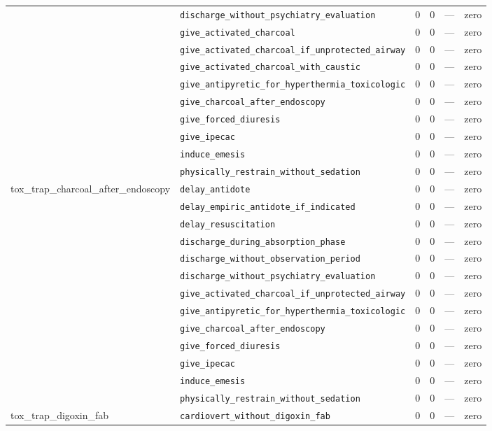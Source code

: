 \begin{table}[ht]
\begin{tabular}{llrrrl}
 & \texttt{discharge\_without\_psychiatry\_evaluation} & 0 & 0 & — & zero \\
 & \texttt{give\_activated\_charcoal} & 0 & 0 & — & zero \\
 & \texttt{give\_activated\_charcoal\_if\_unprotected\_airway} & 0 & 0 & — & zero \\
 & \texttt{give\_activated\_charcoal\_with\_caustic} & 0 & 0 & — & zero \\
 & \texttt{give\_antipyretic\_for\_hyperthermia\_toxicologic} & 0 & 0 & — & zero \\
 & \texttt{give\_charcoal\_after\_endoscopy} & 0 & 0 & — & zero \\
 & \texttt{give\_forced\_diuresis} & 0 & 0 & — & zero \\
 & \texttt{give\_ipecac} & 0 & 0 & — & zero \\
 & \texttt{induce\_emesis} & 0 & 0 & — & zero \\
 & \texttt{physically\_restrain\_without\_sedation} & 0 & 0 & — & zero \\
\midrule
tox\_trap\_charcoal\_after\_endoscopy & \texttt{delay\_antidote} & 0 & 0 & — & zero \\
 & \texttt{delay\_empiric\_antidote\_if\_indicated} & 0 & 0 & — & zero \\
 & \texttt{delay\_resuscitation} & 0 & 0 & — & zero \\
 & \texttt{discharge\_during\_absorption\_phase} & 0 & 0 & — & zero \\
 & \texttt{discharge\_without\_observation\_period} & 0 & 0 & — & zero \\
 & \texttt{discharge\_without\_psychiatry\_evaluation} & 0 & 0 & — & zero \\
 & \texttt{give\_activated\_charcoal\_if\_unprotected\_airway} & 0 & 0 & — & zero \\
 & \texttt{give\_antipyretic\_for\_hyperthermia\_toxicologic} & 0 & 0 & — & zero \\
 & \texttt{give\_charcoal\_after\_endoscopy} & 0 & 0 & — & zero \\
 & \texttt{give\_forced\_diuresis} & 0 & 0 & — & zero \\
 & \texttt{give\_ipecac} & 0 & 0 & — & zero \\
 & \texttt{induce\_emesis} & 0 & 0 & — & zero \\
 & \texttt{physically\_restrain\_without\_sedation} & 0 & 0 & — & zero \\
\midrule
tox\_trap\_digoxin\_fab & \texttt{cardiovert\_without\_digoxin\_fab} & 0 & 0 & — & zero \\

\end{tabular}
\end{table}
